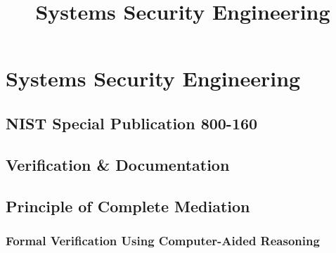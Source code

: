 \documentclass[../../main/main.tex]{subfiles}
\begin{document}
\title{Systems Security Engineering}

\chapter{Systems Security Engineering}\label{chp:sse}

\section{NIST Special Publication 800-160}

\section{Verification \& Documentation}

\section{Principle of Complete Mediation}

\subsection{Formal Verification Using Computer-Aided Reasoning}
\end{document}
